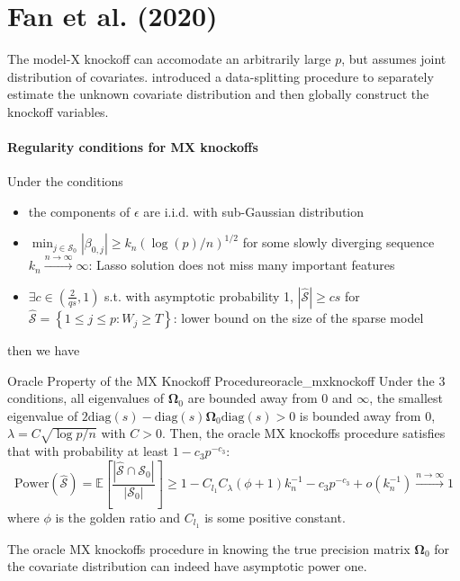 \documentclass[twoside]{article}
\begin{document}
\section{Fan et al. (2020)}
The model-X knockoff \citep{candes2018panning} can accomodate an arbitrarily large $p$, but assumes  joint distribution of covariates. \citet{fan2020rank} introduced a data-splitting procedure to separately estimate the unknown covariate distribution and then globally construct the knockoff variables.

\paragraph*{Regularity conditions for MX knockoffs} Under the conditions 
\begin{itemize}
    \item the components of $\epsilon$ are i.i.d. with sub-Gaussian distribution 
    \item $\min_{j\in \mathcal{S_0}} \left\vert \beta_{0,j} \right\vert \geq k_n\left( \log (p)/n \right)^{1/2}$ for some slowly diverging sequence $k_n\xrightarrow{n\rightarrow\infty} \infty$: Lasso solution does not miss many important features
    \item $\exists c\in \left( \frac{2}{qs},1 \right)$ s.t. with asymptotic probability 1, $\left\vert \hat{\mathcal{S}} \right\vert \geq cs$ for $\hat{\mathcal{S}} = \left\{ 1\leq j\leq p: W_j\geq T \right\}$: lower bound on the size of the sparse model
\end{itemize}
then we have
\begin{theorem}{Oracle Property of the MX Knockoff Procedure}{oracle_mxknockoff}
    Under the 3 conditions, all eigenvalues of $\boldsymbol{\Omega}_0$ are bounded away from 0 and $\infty$, the smallest eigenvalue of $2\mathrm{diag}(s)-\mathrm{diag}(s)\boldsymbol{\Omega}_0 \mathrm{diag}(s)>0$ is bounded away from 0, $\lambda = C\sqrt{\log p/n}$ with $C>0$. Then, the oracle MX knockoffs procedure satisfies that with probability at least $1-c_3p^{-c_3}$:
    $$
    \mathrm{Power}(\hat{\mathcal{S}}) = \mathbb{E}\left[ \frac{\left\vert \hat{\mathcal{S}}\cap \mathcal{S}_0 \right\vert}{\left\vert \mathcal{S}_0 \right\vert} \right] \geq 1 - C_{l_1}C_{\lambda}(\phi +1)k_n^{-1} - c_3 p^{-c_3} + o(k_n^{-1}) \xrightarrow{n\rightarrow \infty} 1
    $$
    where $\phi$ is the golden ratio and $C_{l_1}$ is some positive constant.
\end{theorem}
The oracle MX knockoffs procedure in knowing the true precision matrix $\boldsymbol{\Omega}_0$ for the covariate distribution can indeed have asymptotic power one.

\newpage


\end{document}
